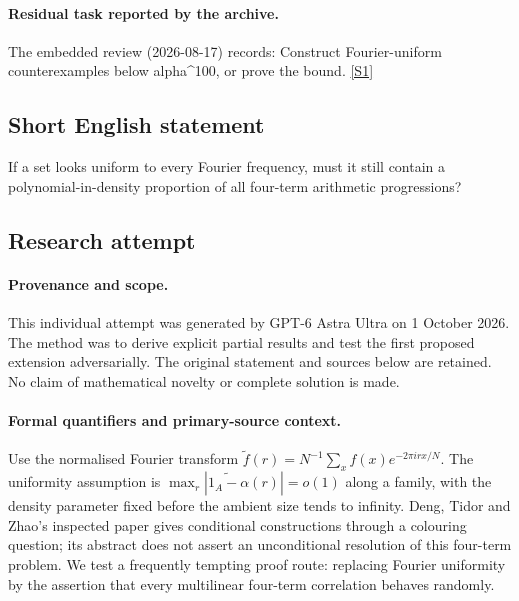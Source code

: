 \documentclass[11pt,a4paper]{article}
\newcommand{\sref}[2]{\hyperlink{source:#1:#2}{[S#2]}}
\begin{document}
\paragraph{Residual task reported by the archive.}

The embedded review (2026-08-17) records: Construct Fourier-uniform counterexamples below alpha\textasciicircum{}100, or prove the bound. \sref{103}{1}

\subsection{Short English statement}

If a set looks uniform to every Fourier frequency, must it still contain a polynomial-in-density proportion of all four-term arithmetic progressions?

\subsection{Research attempt}

\paragraph{Provenance and scope.}
This individual attempt was generated by GPT-6 Astra Ultra on 1 October 2026. The method was to derive explicit partial results and test the first proposed extension adversarially. The original statement and sources below are retained. No claim of mathematical novelty or complete solution is made.

\paragraph{Formal quantifiers and primary-source context.}
Use the normalised Fourier transform $\widetilde f(r)=N^{-1}\sum_x f(x)e^{-2\pi irx/N}$. The uniformity assumption is $\max_r|\widetilde{1_A-\alpha}(r)|=o(1)$ along a family, with the density parameter fixed before the ambient size tends to infinity. Deng, Tidor and Zhao's inspected paper gives conditional constructions through a colouring question; its abstract does not assert an unconditional resolution of this four-term problem. We test a frequently tempting proof route: replacing Fourier uniformity by the assertion that every multilinear four-term correlation behaves randomly.
\end{document}
